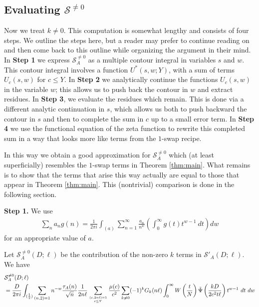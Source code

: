 \documentclass[12pt]{amsart}
\begin{document}
	\subsection{Evaluating $\mathcal{S}^{\neq 0}$}
	\label{subsec:Sneq0}
	
	Now we treat $k\ne 0$. This computation is somewhat lengthy and consists of four steps. We outline the steps here, but a reader may prefer to continue reading on and then come back to this outline while organizing the argument in their mind. In \textbf{Step 1} we express $\mathcal S_A^{\neq 0}$ as a multiple contour integral in variables $s$ and $w$. This contour integral involves a function $U^\ast(s,w;Y)$, with a sum of terms $U_c(s,w)$ for $c \leq Y$. In \textbf{Step 2} we analytically continue the functions $U_c(s,w)$ in the variable $w$; this allows us to push back the contour in $w$ and extract residues. In \textbf{Step 3}, we evaluate the residues which remain. This is done via a different analytic continuation in $s$, which allows us both to push backward the contour in $s$ and then to complete the sum in $c$ up to a small error term. In \textbf{Step 4} we use the functional equation of the zeta function to rewrite this completed sum in a way that looks more like terms from the $1$-swap recipe.
	
	In this way we obtain a good approximation for $\mathcal S_A^{\neq 0}$ which (at least superficially) resembles the $1$-swap terms in Theorem \ref{thm:main}. What remains is to show that the terms that arise this way actually are equal to those that appear in Theorem \ref{thm:main}. This (nontrivial) comparison is done in the following section.
	
	
	\textbf{Step 1.} We use
	\begin{eqnarray*}
		\sum_n a_n g(n)=\frac{1}{2\pi i} \int_{(a)} \sum_{n=1}^\infty \frac{a_n}{n^w} \left(\int_0^\infty g(t) t^{w-1}~dt\right) dw \end{eqnarray*}
	for an appropriate value of $a$. 
	
	Let $\mathcal S_A^{\ne 0}(D;\ell)$ be the contribution of the non-zero $k$ terms in $\mathcal S'_A(D;\ell)$. We have
	\begin{align*}
		&\mathcal S_A^{\ne 0}(D;\ell) \\ &=\frac{D}{2\pi i} \int_{(\frac 12)} \sum_{(n,2)=1} n^{-w} \frac{\tau_A(n)}{\sqrt{n}}\frac{1}{2n\ell}
		\sum_{(c,2n\ell)=1\atop c\le Y}\frac{\mu(c)}{c^2}\sum_{k\ne 0}  (-1)^k G_k(n\ell)  \int_0^\infty  W\left(\frac t N\right)\tilde \Psi\left(\frac {kD}{2c^2t\ell}\right)
		t^{w-1}~dt ~dw
	\end{align*}
	
\end{document}
